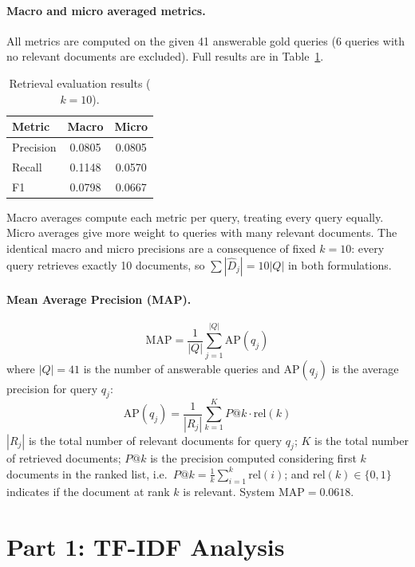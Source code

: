 \documentclass[a4paper,11pt]{article}
\begin{document}
\paragraph{Macro and micro averaged metrics.}
All metrics are computed on the given 41 answerable gold queries (6 queries with no relevant documents are excluded). Full results are in Table~\ref{tab:metrics}.

\begin{table}[h]
\centering
\caption{Retrieval evaluation results ($k=10$).}
\label{tab:metrics}
\begin{tabular}{lcc}
\hline
\textbf{Metric} & \textbf{Macro} & \textbf{Micro} \\
\hline
Precision & 0.0805 & 0.0805 \\
Recall    & 0.1148 & 0.0570 \\
F1        & 0.0798 & 0.0667 \\
\hline
\end{tabular}
\end{table}

Macro averages compute each metric per query, treating every query equally. Micro averages give more weight to queries with many relevant documents. The identical macro and micro precisions are a consequence of fixed $k=10$: every query retrieves exactly 10 documents, so $\sum|\hat{D}_j| = 10|Q|$ in both formulations.
\clearpage
\paragraph{Mean Average Precision (MAP).}
\[
    \mathrm{MAP} = \frac{1}{|Q|} \sum_{j=1}^{|Q|} \mathrm{AP}(q_j)
\]
where $|Q| = 41$ is the number of answerable queries and $\mathrm{AP}(q_j)$ is the average precision for query $q_j$:
\[
    \mathrm{AP}(q_j) = \frac{1}{|R_j|} \sum_{k=1}^{K} P@k \cdot \mathrm{rel}(k)
\]
$|R_j|$ is the total number of relevant documents for query $q_j$; $K$ is the total number of retrieved documents; $P@k$ is the precision computed considering first $k$ documents in the ranked list, i.e.\ $P@k = \frac{1}{k}\sum_{i=1}^{k}\mathrm{rel}(i)$; and $\mathrm{rel}(k) \in \{0,1\}$ indicates if the document at rank $k$ is relevant. System $\mathrm{MAP} = \mathbf{0.0618}$.

\newpage
\section*{Part 1: TF-IDF Analysis}

\label{sec:qualitative-ir}
\end{document}
